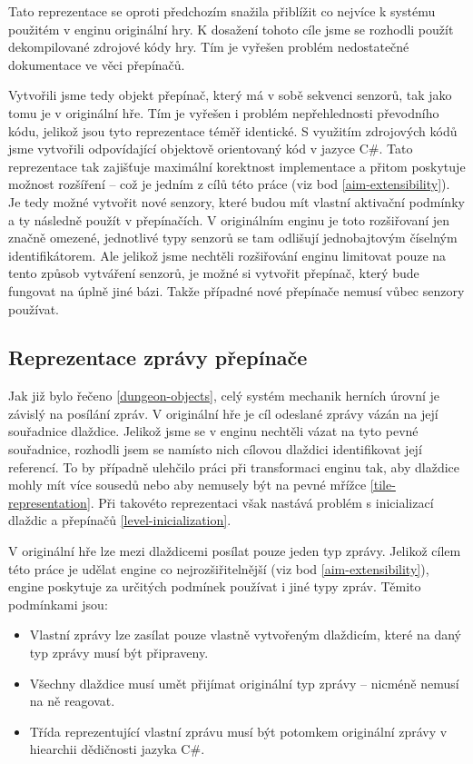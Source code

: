 Tato reprezentace se oproti předchozím snažila přiblížit co nejvíce k systému použitém v enginu originální hry.
K dosažení tohoto cíle jsme se rozhodli použít dekompilované zdrojové kódy \cite{DMDecompilation} hry. Tím
je vyřešen problém nedostatečné dokumentace ve věci přepínačů.

Vytvořili jsme tedy objekt přepínač, který má v sobě sekvenci senzorů, tak jako tomu je v originální hře.
Tím je vyřešen i problém nepřehlednosti převodního kódu, jelikož jsou tyto reprezentace téměř identické.
S využitím zdrojových kódů jsme vytvořili odpovídající objektově orientovaný kód v jazyce C\#. Tato reprezentace
tak zajišťuje maximální korektnost implementace a přitom poskytuje možnost rozšíření -- což je jedním z cílů této práce  (viz bod \ref{aim-extensibility}). 
Je tedy možné vytvořit nové senzory, které budou mít vlastní aktivační podmínky a ty následně použít v přepínačích.
V originálním enginu je toto rozšiřovaní jen značně omezené, jednotlivé typy senzorů se tam odlišují jednobajtovým číselným identifikátorem.
Ale jelikož jsme nechtěli rozšiřování enginu limitovat pouze na tento způsob vytváření senzorů, je možné si vytvořit přepínač, který
bude fungovat na úplně jiné bázi. Takže případné nové přepínače nemusí vůbec senzory používat. 

\subsection{Reprezentace zprávy přepínače}\label{actuator-message-representation}

Jak již bylo řečeno \vref{dungeon-objects}, celý systém mechanik herních úrovní je závislý na posílání zpráv. 
V originální hře je cíl odeslané zprávy vázán na její souřadnice dlaždice. 
Jelikož jsme se v enginu nechtěli vázat na tyto pevné souřadnice, rozhodli jsem se namísto nich
cílovou dlaždici identifikovat její referencí. To by případně ulehčilo práci při transformaci enginu tak, aby
dlaždice mohly mít více sousedů nebo aby nemusely být na pevné mřížce \vref{tile-representation}.
Při takovéto reprezentaci však nastává problém s inicializací dlaždic a přepínačů \vref{level-inicialization}.

V originální hře lze mezi dlaždicemi posílat pouze jeden typ zprávy. Jelikož cílem této práce je udělat engine
co nejrozšiřitelnější  (viz bod \ref{aim-extensibility}), engine poskytuje za určitých podmínek používat i jiné typy zpráv.
Těmito podmínkami jsou:
\begin{itemize}
\item Vlastní zprávy lze zasílat pouze vlastně vytvořeným dlaždicím, které na daný typ zprávy musí být připraveny.
\item Všechny dlaždice musí umět přijímat originální typ zprávy -- nicméně nemusí na ně reagovat.
\item Třída reprezentující vlastní zprávu musí být potomkem originální zprávy v hiearchii dědičnosti jazyka C\#.
\end{itemize}

